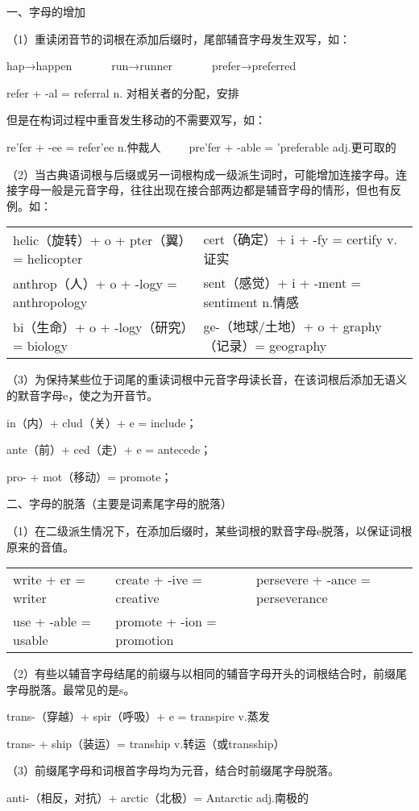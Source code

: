 一、字母的增加

（1）重读闭音节的词根在添加后缀时，尾部辅音字母发生双写，如：

hap→happen~~~~~~~run→runner~~~~~~~prefer→preferred

refer + -al = referral n. 对相关者的分配，安排

但是在构词过程中重音发生移动的不需要双写，如：

re'fer + -ee = refer'ee n.仲裁人~~~~~pre'fer + -able = 'preferable adj.更可取的

（2）当古典语词根与后缀或另一词根构成一级派生词时，可能增加连接字母。连接字母一般是元音字母，往往出现在接合部两边都是辅音字母的情形，但也有反例。如：

\begin{tabular}{@{}ll@{}}
helic（旋转）+ o + pter（翼）= helicopter&cert（确定）+ i + -fy = certify v.证实\\
anthrop（人）+ o + -logy = anthropology&sent（感觉）+ i + -ment = sentiment n.情感\\
bi（生命）+ o + -logy（研究）= biology&ge-（地球/土地）+ o + graphy（记录）= geography
\end{tabular}

（3）为保持某些位于词尾的重读词根中元音字母读长音，在该词根后添加无语义的默音字母e，使之为开音节。

 in（内）+ clud（关）+ e = include；
 
 ante（前）+ ced（走）+ e = antecede；
 
 pro- + mot（移动）= promote；

二、字母的脱落（主要是词素尾字母的脱落）

（1）在二级派生情况下，在添加后缀时，某些词根的默音字母e脱落，以保证词根原来的音值。

\begin{tabular}{@{}lll@{}}
write + er = writer&create + -ive = creative&persevere + -ance = perseverance\\
use + -able = usable&promote + -ion = promotion
\end{tabular}

（2）有些以辅音字母结尾的前缀与以相同的辅音字母开头的词根结合时，前缀尾字母脱落。最常见的是s。

trans-（穿越）+ spir（呼吸）+ e = transpire v.蒸发

trans- + ship（装运）= tranship v.转运（或transship）

（3）前缀尾字母和词根首字母均为元音，结合时前缀尾字母脱落。

    anti-（相反，对抗）+ arctic（北极）= Antarctic adj.南极的

